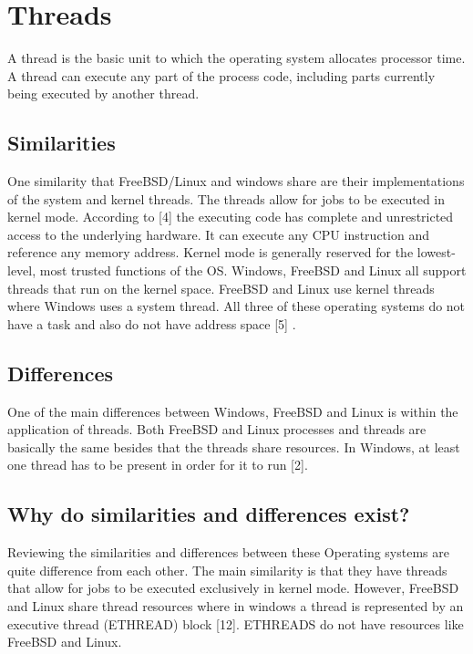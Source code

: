 \documentclass[letterpaper,10pt,titlepage]{article}
\begin{document}
\section{Threads}

A thread is the basic unit to which the operating system allocates processor time. A thread can execute any part of the process code, including parts currently being executed by another thread.

\subsection{Similarities}

One similarity that FreeBSD/Linux and windows share are their implementations of the system and kernel threads. The threads allow for jobs to be executed in kernel mode. According to [4] the executing code has complete and unrestricted access to the underlying hardware. It can execute any CPU instruction and reference any memory address. Kernel mode is generally reserved for the lowest-level, most trusted functions of the OS. Windows, FreeBSD and Linux all support threads that run on the kernel space. FreeBSD and Linux use kernel threads where Windows uses a system thread. All three of these operating systems do not have a task and also do not have address space [5] .


\subsection{Differences}

One of the main differences between Windows, FreeBSD and Linux is within the application of threads. Both FreeBSD and Linux processes and threads are basically the same besides that the threads share resources. In Windows, at least one thread has to be present in order for it to run [2]. \\

\subsection{Why do similarities and differences exist?}

Reviewing the similarities and differences between these Operating systems are quite difference from each other. The main similarity is that they have threads that allow for jobs to be executed exclusively in kernel mode. However, FreeBSD and Linux share thread resources where in windows a thread is represented by an executive thread (ETHREAD) block [12]. ETHREADS do not have resources like FreeBSD and Linux.
\end{document}

